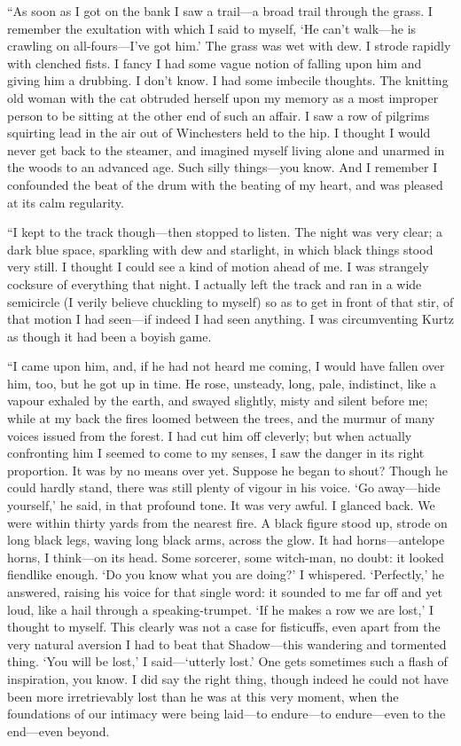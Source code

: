 \documentclass[12pt]{report}
\begin{document}
``As soon as I got on the bank I saw a trail---a broad trail through the
grass. I remember the exultation with which I said to myself, `He can't
walk---he is crawling on all-fours---I've got him.' The grass was wet
with dew. I strode rapidly with clenched fists. I fancy I had some vague
notion of falling upon him and giving him a drubbing. I don't know. I
had some imbecile thoughts. The knitting old woman with the cat obtruded
herself upon my memory as a most improper person to be sitting at the
other end of such an affair. I saw a row of pilgrims squirting lead in
the air out of Winchesters held to the hip. I thought I would never get
back to the steamer, and imagined myself living alone and unarmed in the
woods to an advanced age. Such silly things---you know. And I remember I
confounded the beat of the drum with the beating of my heart, and was
pleased at its calm regularity.

``I kept to the track though---then stopped to listen. The night was
very clear; a dark blue space, sparkling with dew and starlight, in
which black things stood very still. I thought I could see a kind of
motion ahead of me. I was strangely cocksure of everything that night. I
actually left the track and ran in a wide semicircle (I verily believe
chuckling to myself) so as to get in front of that stir, of that motion
I had seen---if indeed I had seen anything. I was circumventing Kurtz as
though it had been a boyish game.

``I came upon him, and, if he had not heard me coming, I would have
fallen over him, too, but he got up in time. He rose, unsteady, long,
pale, indistinct, like a vapour exhaled by the earth, and swayed
slightly, misty and silent before me; while at my back the fires loomed
between the trees, and the murmur of many voices issued from the forest.
I had cut him off cleverly; but when actually confronting him I seemed
to come to my senses, I saw the danger in its right proportion. It was
by no means over yet. Suppose he began to shout? Though he could hardly
stand, there was still plenty of vigour in his voice. `Go away---hide
yourself,' he said, in that profound tone. It was very awful. I glanced
back. We were within thirty yards from the nearest fire. A black figure
stood up, strode on long black legs, waving long black arms, across the
glow. It had horns---antelope horns, I think---on its head. Some
sorcerer, some witch-man, no doubt: it looked fiendlike enough. `Do you
know what you are doing?' I whispered. `Perfectly,' he answered, raising
his voice for that single word: it sounded to me far off and yet loud,
like a hail through a speaking-trumpet. `If he makes a row we are lost,'
I thought to myself. This clearly was not a case for fisticuffs, even
apart from the very natural aversion I had to beat that Shadow---this
wandering and tormented thing. `You will be lost,' I said---`utterly
lost.' One gets sometimes such a flash of inspiration, you know. I did
say the right thing, though indeed he could not have been more
irretrievably lost than he was at this very moment, when the foundations
of our intimacy were being laid---to endure---to endure---even to the
end---even beyond.
\end{document}
